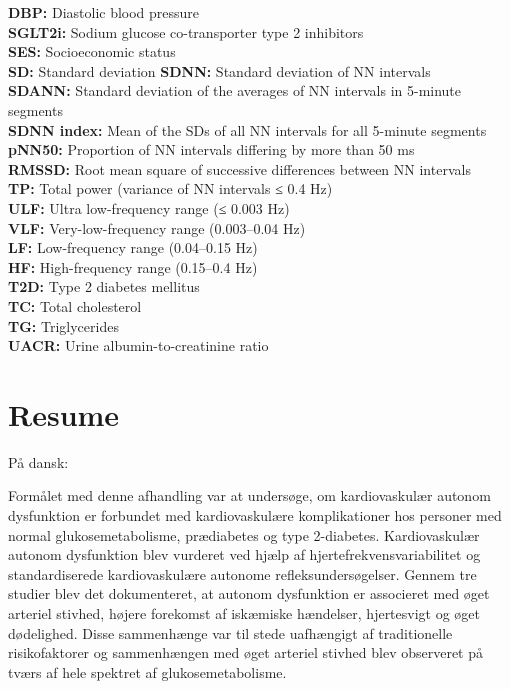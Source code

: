 \documentclass[
  a4paper,
  headsepline=true,
  open=any]{scrbook}
\begin{document}
\textbf{DBP:} Diastolic blood pressure\\
\textbf{SGLT2i:} Sodium glucose co-transporter type 2 inhibitors\\
\textbf{SES:} Socioeconomic status\\
\textbf{SD:} Standard deviation \textbf{SDNN:} Standard deviation of NN
intervals\\
\textbf{SDANN:} Standard deviation of the averages of NN intervals in
5-minute segments\\
\textbf{SDNN index:} Mean of the SDs of all NN intervals for all
5-minute segments\\
\textbf{pNN50:} Proportion of NN intervals differing by more than 50
ms\\
\textbf{RMSSD:} Root mean square of successive differences between NN
intervals\\
\textbf{TP:} Total power (variance of NN intervals ≤ 0.4 Hz)\\
\textbf{ULF:} Ultra low-frequency range (≤ 0.003 Hz)\\
\textbf{VLF:} Very-low-frequency range (0.003--0.04 Hz)\\
\textbf{LF:} Low-frequency range (0.04--0.15 Hz)\\
\textbf{HF:} High-frequency range (0.15--0.4 Hz)\\
\textbf{T2D:} Type 2 diabetes mellitus\\
\textbf{TC:} Total cholesterol\\
\textbf{TG:} Triglycerides\\
\textbf{UACR:} Urine albumin-to-creatinine ratio


\hypertarget{resume}{%
\chapter*{Resume}\label{resume}}


På dansk:

Formålet med denne afhandling var at undersøge, om kardiovaskulær
autonom dysfunktion er forbundet med kardiovaskulære komplikationer hos
personer med normal glukosemetabolisme, prædiabetes og type 2-diabetes.
Kardiovaskulær autonom dysfunktion blev vurderet ved hjælp af
hjertefrekvensvariabilitet og standardiserede kardiovaskulære autonome
refleksundersøgelser. Gennem tre studier blev det dokumenteret, at
autonom dysfunktion er associeret med øget arteriel stivhed, højere
forekomst af iskæmiske hændelser, hjertesvigt og øget dødelighed. Disse
sammenhænge var til stede uafhængigt af traditionelle risikofaktorer og
sammenhængen med øget arteriel stivhed blev observeret på tværs af hele
spektret af glukosemetabolisme.
\end{document}
